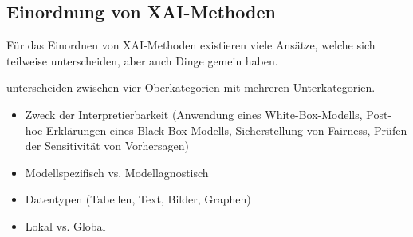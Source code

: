 \subsection{Einordnung von XAI-Methoden}
Für das Einordnen von XAI-Methoden existieren viele Ansätze, welche sich teilweise unterscheiden, aber auch Dinge gemein haben.

\cite{linardatos2020explainable} unterscheiden zwischen vier Oberkategorien mit mehreren Unterkategorien.
\begin{itemize}
    \item Zweck der Interpretierbarkeit (Anwendung eines White-Box-Modells, Post-hoc-Erklärungen eines Black-Box Modells, Sicherstellung von Fairness, Prüfen der Sensitivität von Vorhersagen)
    \item Modellspezifisch vs. Modellagnostisch
    \item Datentypen (Tabellen, Text, Bilder, Graphen)
    \item Lokal vs. Global
\end{itemize}

